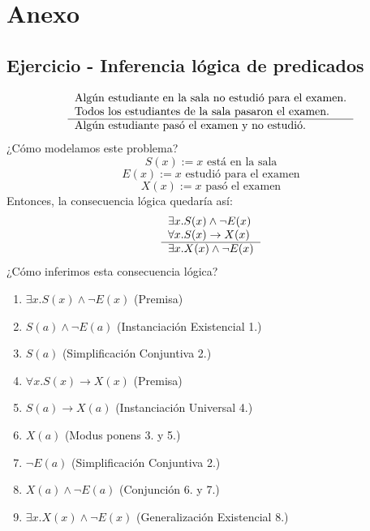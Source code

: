 \documentclass[../main.tex]{subfiles}
\begin{document}
\section{Anexo}
\subsection{Ejercicio - Inferencia lógica de predicados}
\[
    \begin{tabular}{l}
        Algún estudiante en la sala no estudió para el examen.\\
        Todos los estudiantes de la sala pasaron el examen.\\ \hline
        Algún estudiante pasó el examen y no estudió.
    \end{tabular}
\]
¿Cómo modelamos este problema?
$$S(x) := x \text{ está en la sala}$$
$$E(x) := x \text{ estudió para el examen}$$
$$X(x) := x \text{ pasó el examen}$$
Entonces, la consecuencia lógica quedaría así:
\[
    \begin{tabular}{l}
        $\exists{} x . S(x) \wedge{} \neg{} E(x)$\\
        $\forall{} x . S(x) \rightarrow{} X(x)$\\ \hline
        $\exists{} x . X(x) \wedge{} \neg{} E(x)$
    \end{tabular}
\]
¿Cómo inferimos esta consecuencia lógica?
\begin{enumerate}
    \item $\exists x . S(x) \wedge \neg E(x)$ (Premisa)
    \item $S(a) \wedge \neg E(a)$ (Instanciación Existencial 1.)
    \item $S(a)$ (Simplificación Conjuntiva 2.)
    \item $\forall x . S(x) \rightarrow X(x)$ (Premisa)
    \item $S(a) \rightarrow X(a)$ (Instanciación Universal 4.)
    \item $X(a)$ (Modus ponens 3. y 5.)
    \item $\neg E(a)$ (Simplificación Conjuntiva 2.)
    \item $X(a) \wedge \neg E(a)$ (Conjunción 6. y 7.)
    \item $\exists x . X(x) \wedge \neg E(x)$ (Generalización Existencial 8.)
\end{enumerate}
\end{document}
